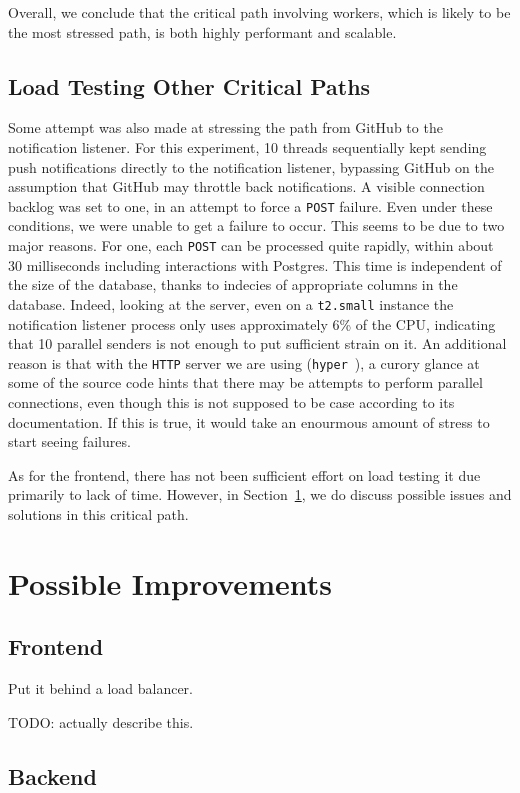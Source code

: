 \documentclass{scrartcl}
\begin{document}
Overall, we conclude that the critical path involving workers, which is likely to be the most stressed path, is both highly performant and scalable.

\subsection{Load Testing Other Critical Paths}
Some attempt was also made at stressing the path from GitHub to the notification listener.
For this experiment, 10 threads sequentially kept sending push notifications directly to the notification listener, bypassing GitHub on the assumption that GitHub may throttle back notifications.
A visible connection backlog was set to one, in an attempt to force a \texttt{POST} failure.
Even under these conditions, we were unable to get a failure to occur.
This seems to be due to two major reasons.
For one, each \texttt{POST} can be processed quite rapidly, within about 30 milliseconds including interactions with Postgres.
This time is independent of the size of the database, thanks to indecies of appropriate columns in the database.
Indeed, looking at the server, even on a \texttt{t2.small} instance the notification listener process only uses approximately 6\% of the CPU, indicating that 10 parallel senders is not enough to put sufficient strain on it.
An additional reason is that with the \texttt{HTTP} server we are using (\texttt{hyper}~\cite{hyper}), a curory glance at some of the source code hints that there may be attempts to perform parallel connections, even though this is not supposed to be case according to its documentation.
If this is true, it would take an enourmous amount of stress to start seeing failures.

As for the frontend, there has not been sufficient effort on load testing it due primarily to lack of time.
However, in Section~\ref{sec:performance_improvements}, we do discuss possible issues and solutions in this critical path.

\section{Possible Improvements}
\label{sec:performance_improvements}

\subsection{Frontend}
Put it behind a load balancer.

TODO: actually describe this.
\subsection{Backend}
\end{document}
